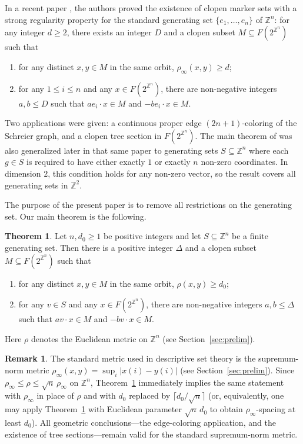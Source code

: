 \documentclass{amsart}
\theoremstyle{definition}
\newtheorem{theorem}{Theorem}[section]
\newtheorem*{remark}{Remark}
\newcommand{\Z}{\mathbb Z}
\begin{document}
In a recent paper \cite{GW25}, the authors proved the existence of clopen
marker sets with a strong regularity property for the standard generating
set $\{e_1,\dots,e_n\}$ of $\mathbb{Z}^n$: for any integer $d\geq 2$, there exists an integer $D$ and a clopen subset $M\subseteq F(2^{\Z^n})$ such that 
\begin{enumerate}
\item[(1)] for any distinct $x,y\in M$ in the same orbit,
$\rho_\infty(x,y)\geq d$;
\item[(2)] for any $1\leq i\leq n$ and any $x\in F(2^{\mathbb{Z}^n})$,
there are non-negative integers $a,b\leq D$ such that
$ae_i\cdot x\in M$ and $-be_i\cdot x\in M$.
\end{enumerate}
Two applications were given: a continuous proper edge $(2n+1)$-coloring of
the Schreier graph, and a clopen tree section in $F(2^{\mathbb{Z}^n})$.
The main theorem of \cite{GW25} was also generalized later in that same
paper to generating sets $S\subseteq \mathbb{Z}^n$ where each $g\in S$ is
required to have either exactly $1$ or exactly $n$ non-zero coordinates.
In dimension $2$, this condition holds for any non-zero vector, so the
result covers all generating sets in $\mathbb{Z}^2$.

The purpose of the present paper is to remove all restrictions on the
generating set. Our main theorem is the following.

\begin{theorem}\label{thm:main}
Let $n, d_0\geq 1$ be positive integers and let $S\subseteq \mathbb{Z}^n$ be a finite generating set. Then there is a positive integer $\Delta$ and a clopen subset $M\subseteq F(2^{\mathbb{Z}^n})$ such that
\begin{enumerate}
\item[(1)] for any distinct $x,y\in M$ in the same orbit, $\rho(x,y)\geq d_0$;
\item[(2)] for any $v\in S$ and any $x\in F(2^{\mathbb{Z}^n})$, there are non-negative integers $a, b\leq \Delta$ such that $av\cdot x\in M$ and $-bv\cdot x\in M$.
\end{enumerate}
Here $\rho$ denotes the Euclidean metric on $\mathbb{Z}^n$ (see Section~\ref{sec:prelim}).
\end{theorem}

\begin{remark}\label{rem:infinity}
The standard metric used in descriptive set theory is the supremum-norm
metric $\rho_\infty(x,y)=\sup_i|x(i)-y(i)|$ (see Section~\ref{sec:prelim}).
Since $\rho_\infty\leq \rho\leq\sqrt{n}\,\rho_\infty$ on $\mathbb{Z}^n$,
Theorem~\ref{thm:main} immediately implies the same statement with
$\rho_\infty$ in place of $\rho$ and with $d_0$ replaced by
$\lceil d_0/\sqrt{n}\rceil$ (or, equivalently, one may apply
Theorem~\ref{thm:main} with Euclidean parameter $\sqrt{n}\,d_0$ to obtain
$\rho_\infty$-spacing at least $d_0$). All geometric conclusions---the
edge-coloring application, and the existence of tree sections---remain
valid for the standard supremum-norm metric.
\end{remark}
\end{document}

